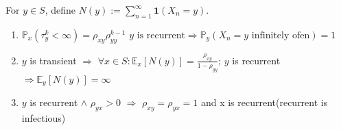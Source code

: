  \begin{theorem}
 	 For $y \in S$, define $N(y):= \sum_{n = 1}^\infty \textbf{1}(X_n = y)$.
 	 \begin{enumerate}
 	 	\item $\mathbb{P}_x(\tau_y^k < \infty) = \rho_{xy}\rho_{yy}^{k-1}$\newline
 	 		$y \text{ is recurrent} \Rightarrow \mathbb{P}_y(X_n = y \text{ infinitely ofen}) = 1$

 	 	\item $y$ is transient $\Rightarrow$ $\forall x \in S:\mathbb{E}_x[N(y)] = \frac{\rho_{xy}}{1 - \rho_{yy}}$; \newline
 	 		  $y$ is recurrent $\Rightarrow \mathbb{E}_y[N(y)] = \infty$
 	 	\item $y$ is recurrent $\wedge$ $\rho_{yx} > 0$ $\Rightarrow$ $\rho_{xy} = \rho_{yx} = 1$ and x is recurrent(recurrent is infectious)
 	 \end{enumerate}
 \end{theorem}
